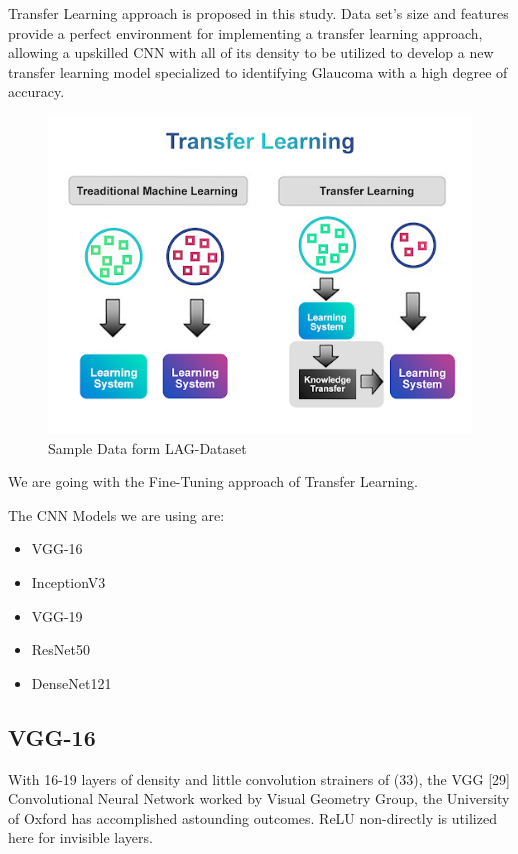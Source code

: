 \vspace{5mm}
\noindent Transfer Learning approach is proposed in this study. Data set’s size and features provide a perfect environment for implementing a transfer learning approach, allowing a upskilled CNN with all of its density to be utilized to develop a new transfer learning model specialized to identifying Glaucoma with a high degree of accuracy.


\vspace{5mm}
\begin{figure}[hbt!]
\centering
\includegraphics[scale=0.75]{images/fig-7.png}
\caption{Sample Data form LAG-Dataset}
\label{fig:x Sample Data form LAG-Dataset}
\end{figure}

\vspace{5mm}
\noindent We are going with the Fine-Tuning approach of Transfer Learning.

\vspace{5mm}
\noindent The CNN Models we are using are:

\begin{itemize}
    \item VGG-16
    \item InceptionV3
    \item VGG-19
    \item ResNet50
    \item DenseNet121
\end{itemize}

\subsection{VGG-16}
With 16-19 layers of density and little convolution strainers of (33), the VGG [29] Convolutional Neural Network worked by Visual Geometry Group, the University of Oxford has accomplished astounding outcomes. ReLU non-directly is utilized here for invisible layers.

